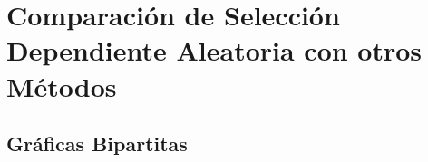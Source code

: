 \chapter{Comparación de Selección Dependiente Aleatoria con otros Métodos}

\section{Gráficas Bipartitas}
